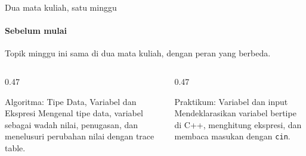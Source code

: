 \documentclass[t]{beamer}
\begin{document}

\begin{frame}{Dua mata kuliah, satu minggu}
\framesubtitle{Sebelum mulai}
Topik minggu ini sama di dua mata kuliah, dengan peran yang berbeda.
\vspace{10pt}

\begin{columns}[T]
\begin{column}{0.47\textwidth}
\begin{Blok}{Algoritma: Tipe Data, Variabel dan Ekspresi}
Mengenal tipe data, variabel sebagai wadah nilai, penugasan, dan menelusuri perubahan nilai dengan trace table.
\end{Blok}
\end{column}
\begin{column}{0.47\textwidth}
\begin{BlokGelap}{Praktikum: Variabel dan input}
Mendeklarasikan variabel bertipe di C++, menghitung ekspresi, dan membaca masukan dengan \texttt{cin}.
\end{BlokGelap}
\end{column}
\end{columns}
\end{frame}
\end{document}

